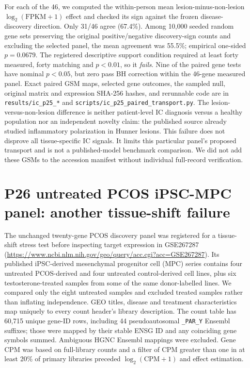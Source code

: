 \documentclass[11pt,a4paper]{article}
\begin{document}
For each of the 46, we computed the within-person mean lesion-minus-non-lesion $\log_2(\mathrm{FPKM}+1)$ effect and checked its sign against the frozen disease-discovery direction. Only 31/46 agree (67.4\%). Among 10,000 seeded random gene sets preserving the original positive/negative discovery-sign counts and excluding the selected panel, the mean agreement was 55.5\%; empirical one-sided $p=0.0679$. The registered descriptive support condition required at least forty measured, forty matching and $p<0.01$, so it \emph{fails}. Nine of the paired gene tests have nominal $p<0.05$, but zero pass BH correction within the 46-gene measured panel. Exact paired GSM maps, selected gene outcomes, the sampled null, original matrix and expression SHA-256 hashes, and rerunnable code are in \texttt{results/ic\_p25\_*} and \texttt{scripts/ic\_p25\_paired\_transport.py}. The lesion-versus-non-lesion difference is neither patient-level IC diagnosis versus a healthy population nor an independent novelty claim: the published source already studied inflammatory polarization in Hunner lesions. This failure does not disprove all tissue-specific IC signals. It limits this particular panel's proposed transport and is not a published-model benchmark comparison. We did not add these GSMs to the accession manifest without individual full-record verification.

\section{P26 untreated PCOS iPSC-MPC panel: another tissue-shift failure}
The unchanged twenty-gene PCOS discovery panel was registered for a tissue-shift stress test before inspecting target expression in GSE267287 (\url{https://www.ncbi.nlm.nih.gov/geo/query/acc.cgi?acc=GSE267287}). Its published iPSC-derived mesenchymal progenitor cell (MPC) series contains four untreated PCOS-derived and four untreated control-derived cell lines, plus six testosterone-treated samples from some of the same donor-labelled lines. We compared only the eight untreated samples and excluded treated samples rather than inflating independence. GEO titles, disease and treatment characteristics map uniquely to every count header's library description. The count table has 60,715 unique gene-ID rows, including 44 pseudoautosomal \texttt{\_PAR\_Y} Ensembl suffixes; those were mapped by their stable ENSG ID and any coinciding gene symbols summed. Ambiguous HGNC Ensembl mappings were excluded. Gene CPM was based on full-library counts and a filter of CPM greater than one in at least 20\% of primary libraries preceded $\log_2(\mathrm{CPM}+1)$ and effect estimation.
\end{document}
